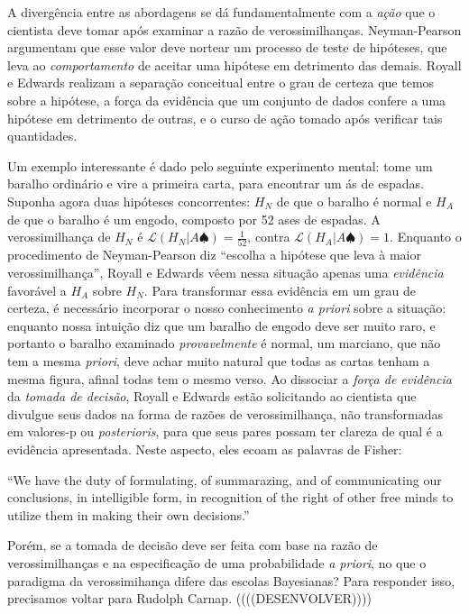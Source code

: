 A divergência entre as abordagens se dá fundamentalmente com a {\em ação} que o cientista deve tomar após examinar a 
razão de verossimilhanças. Neyman-Pearson argumentam que esse valor deve nortear um processo de teste de hipóteses, que
leva ao {\em comportamento} de aceitar uma hipótese em detrimento das demais. Royall e Edwards realizam a separação
conceitual entre o grau de certeza que temos sobre a hipótese, a força da evidência que um conjunto de dados confere
a uma hipótese em detrimento de outras, e o curso de ação tomado após verificar tais quantidades. 

Um exemplo interessante é dado pelo seguinte experimento mental: tome um baralho ordinário e vire a primeira carta,
para encontrar um ás de espadas. Suponha agora duas hipóteses concorrentes: $H_N$ de que o baralho é normal e $H_A$
de que o baralho é um engodo, composto por 52 ases de espadas. A verossimilhança de $H_N$ é 
$\mathcal{L} (H_N|A \spadesuit) = \frac{1}{52}$, contra $\mathcal{L} (H_A | A \spadesuit) = 1 $. Enquanto o procedimento
de Neyman-Pearson diz ``escolha a hipótese que leva à maior verossimilhança'', Royall e Edwards vêem nessa situação
apenas uma {\em evidência} favorável a $H_A$ sobre $H_N$. Para transformar essa evidência em um grau de certeza,
é necessário incorporar o nosso conhecimento {\em a priori} sobre a situação: enquanto nossa intuição diz
que um baralho de engodo deve ser muito raro, e portanto o baralho examinado {\em provavelmente} é normal, um marciano,
que não tem a mesma {\em priori}, deve achar muito natural que todas as cartas tenham a mesma figura, afinal todas tem o mesmo
verso. Ao dissociar a {\em força de evidência} da {\em tomada de decisão}, Royall e Edwards estão solicitando ao cientista
que divulgue seus dados na forma de razões de verossimilhança, não transformadas em valores-p ou {\em posterioris}, para que
seus pares possam ter clareza de qual é a evidência apresentada. Neste aspecto, eles ecoam as palavras de Fisher:

``We have the duty of formulating, of summarazing, and of communicating our conclusions, in intelligible form, in
recognition of the right of other free minds to utilize them in making their own decisions.'' \citep{Fisher55}

Porém, se a tomada de decisão deve ser feita com base na razão de verossimilhanças e na especificação de uma 
probabilidade {\em a priori}, no que o paradigma da verossimihança difere das escolas Bayesianas? Para responder isso,
precisamos voltar para Rudolph Carnap. ((((DESENVOLVER))))


